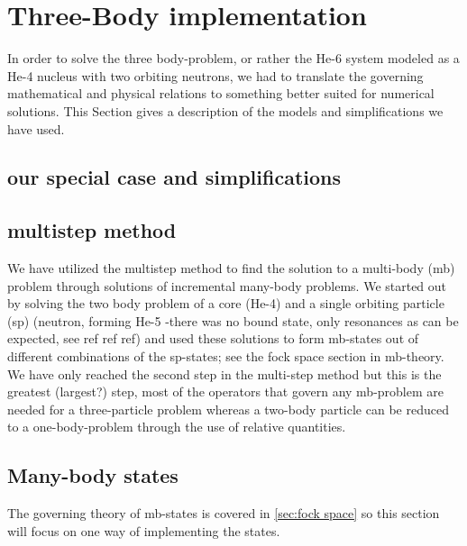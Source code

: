 \section{Three-Body implementation}
In order to solve the three body-problem, or rather the He-6 system modeled as a He-4 nucleus with two orbiting neutrons, we had to translate the governing mathematical and physical relations to something better suited for numerical solutions.
 This Section gives a description of the models and simplifications we have used.

\subsection{our special case and simplifications}
\subsection{multistep method}
We have utilized the multistep method to find the solution to a multi-body (mb) problem through solutions of incremental many-body problems.
 We started out by solving the two body problem of a core (He-4) and a single orbiting particle (sp) (neutron, forming He-5 -there was no bound state, only resonances as can be expected, see ref ref ref) and used these solutions to form mb-states out of different combinations of the sp-states; see the fock space section in mb-theory.
 We have only reached the second step in the multi-step method but this is the greatest (largest?) step, most of the operators that govern any mb-problem are needed for a three-particle problem whereas a two-body particle can be reduced to a one-body-problem through the use of relative quantities.
 
\subsection{Many-body states}
The governing theory of mb-states is covered in \cref{sec:fock space} so this section will focus on one way of implementing the states. 

